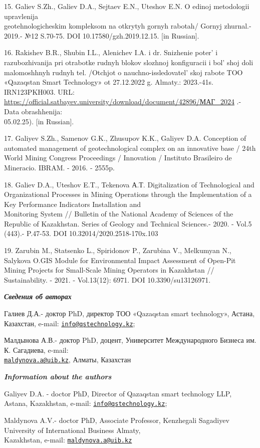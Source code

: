 \begin{references}
15. Galiev S.Zh., Galiev D.A., Sejtaev E.N., Uteshov E.N. O edinoj
metodologii upravlenija \\geotehnologicheskim kompleksom na otkrytyh
gornyh rabotah/ Gornyj zhurnal.- 2019.- №12 S.70-75. DOI
10.17580/gzh.2019.12.15. {[}in Russian{]}.

16. Rakishev B.R., Shubin I.L., Alenichev I.A. i dr. Snizhenie
poter'{} i razubozhivanija pri otrabotke rudnyh blokov
slozhnoj konfiguracii i bol' shoj doli malomoshhnyh
rudnyh tel. /Otchjot o nauchno-issledovatel' skoj rabote
TOO «Qazaqstan Smart Technology» ot 27.12.2022 g. Almaty.: 2023.-41s.
IRN123PKH003. URL:
\url{https://official.satbayev.university/download/document/42896/МАГ_2024}
.- Data obrashhenija: \\05.02.25). {[}in Russian{]}.

17. Galiyev S.Zh., Samenov G.K., Zhusupov K.K., Galiyev D.A. Conception
of automated management of geotechnological complex on an innovative
base / 24th World Mining Congress Proceedings / Innovation / Instituto
Brasileiro de Mineracio. IBRAM. - 2016. - 2555p.

18. Galiev D.A., Uteshov E.T., Tekenova А.Т. Digitalization of
Technological and Organizational Processes in Mining Operations through
the Implementation of a Key Performance Indicators Installation and\\
Monitoring System // Bulletin of the National Academy of Sciences of the
Republic of Kazakhstan. Series of Geology and Technical Sciences.-
2020. - Vol.5 (443).- P.47-53. DOI 10.32014/2020.2518-170x.103

19. Zarubin M., Statsenko L., Spiridonov P., Zarubina V., Melkumyan N.,
Salykova O.GIS Module for Environmental Impact Assessment of Open-Pit
Mining Projects for Small-Scale Mining Operators in Kazakhstan //
Sustainability. - 2021. - Vol.13(12): 6971. DOI 10.3390/su13126971.
\end{references}

\begin{authorinfo}
\emph{{\bfseries Сведения об авторах}}

Галиев Д.А.- доктор PhD, директор ТОО «Qazaqstan smart technology»,
Астана, Казахстан, e-mail:
\href{mailto:info@qstechnology.kz}{\nolinkurl{info@qstechnology.kz}};

Малдынова А.В.- доктор PhD, доцент, Университет Международного Бизнеса
им. К. Сагадиева, e-mail:\\
\href{mailto:maldynova.a@uib.kz}{\nolinkurl{maldynova.a@uib.kz}},
Алматы, Казахстан

\emph{{\bfseries Information about the authors}}

Galiyev D.A. - doctor PhD, Director of Qazaqstan smart technology LLP,
Astana, Kazakhstan, e-mail:
\href{mailto:info@qstechnology.kz}{\nolinkurl{info@qstechnology.kz}};

Maldynova A.V.- doctor PhD, Associate Professor, Kenzhegali Sagadiyev
University of International Business Almaty, \\Kazakhstan, e-mail:
\href{mailto:maldynova.a@uib.kz}{\nolinkurl{maldynova.a@uib.kz}}
\end{authorinfo}
